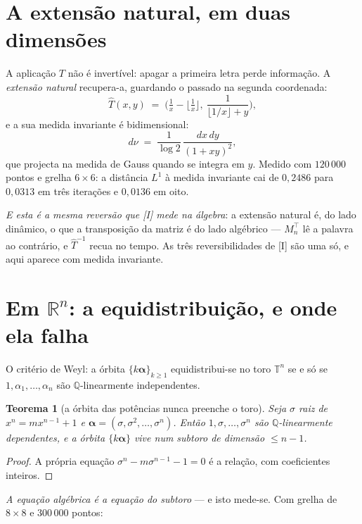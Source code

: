 \documentclass[11pt,a4paper]{article}
\theoremstyle{plain}
\newtheorem{teorema}{Teorema}[section]
\theoremstyle{definition}
\theoremstyle{remark}
\newcommand{\R}{\mathbb{R}}
\newcommand{\Q}{\mathbb{Q}}
\begin{document}
\section{A extensão natural, em duas dimensões}\label{sec:extnat}

A aplicação $T$ não é invertível: apagar a primeira letra perde informação. A \emph{extensão
natural} recupera-a, guardando o passado na segunda coordenada:
\[
  \widehat T(x,y) \;=\; \Big(\tfrac1x - \big\lfloor\tfrac1x\big\rfloor,\ \frac{1}{\lfloor 1/x\rfloor + y}\Big),
\]
e a sua medida invariante é bidimensional:
\[
  d\nu \;=\; \frac{1}{\log 2}\,\frac{dx\,dy}{(1+xy)^2} ,
\]
que projecta na medida de Gauss quando se integra em $y$. Medido com $120\,000$ pontos e grelha
$6\times6$: a distância $L^1$ à medida invariante cai de $0{,}2486$ para $0{,}0313$ em três
iterações e $0{,}0136$ em oito.

\emph{E esta é a mesma reversão que [I] mede na álgebra}: a extensão natural é, do lado dinâmico, o
que a transposição da matriz é do lado algébrico --- $M_n^{\!\top}$ lê a palavra ao contrário, e
$\widehat T^{-1}$ recua no tempo. As três reversibilidades de [I] são uma só, e aqui aparece com
medida invariante.

\section{Em $\R^n$: a equidistribuição, e onde ela falha}\label{sec:rn}

O critério de Weyl: a órbita $\{k\boldsymbol\alpha\}_{k\geq1}$ equidistribui-se no toro
$\mathbb T^n$ se e só se $1,\alpha_1,\dots,\alpha_n$ são $\Q$-linearmente independentes.

\begin{teorema}[a órbita das potências nunca preenche o toro]\label{thm:subtoro}
Seja $\sigma$ raiz de $x^n = m x^{n-1}+1$ e $\boldsymbol\alpha = (\sigma,\sigma^2,\dots,\sigma^n)$.
Então $1,\sigma,\dots,\sigma^n$ são $\Q$-linearmente \emph{dependentes}, e a órbita
$\{k\boldsymbol\alpha\}$ vive num subtoro de dimensão $\leq n-1$.
\end{teorema}

\begin{proof}
A própria equação $\sigma^n - m\sigma^{n-1} - 1 = 0$ é a relação, com coeficientes inteiros.
\end{proof}

\noindent \emph{A equação algébrica é a equação do subtoro} --- e isto mede-se. Com grelha de
$8\times8$ e $300\,000$ pontos:
\end{document}
